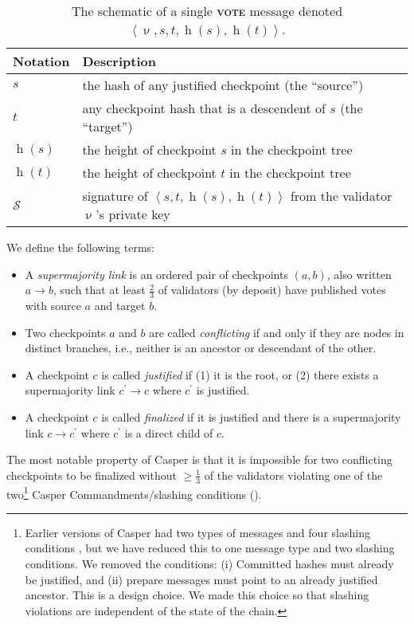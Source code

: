 \documentclass[12pt]{article}
\newcommand{\signature}{\ensuremath{\mathcal{S}}\xspace}
\newcommand{\h}{\operatorname{h}\xspace}
\newcommand{\msgVOTE}{\textbf{\textsc{vote}}\xspace}
\begin{document}
\begin{table}[bth]
\centering

   \begin{tabular}{l l}
	\toprule
	\textbf{Notation} & \textbf{Description} \\
	\midrule
	$s$ & the hash of any justified checkpoint (the ``source'') \\
	$t$ & any checkpoint hash that is a descendent of  $s$ (the ``target'') \\
	$\h(s)$ & the height of checkpoint $s$ in the checkpoint tree \\
	$\h(t)$ & the height of checkpoint $t$ in the checkpoint tree \\
	\signature & signature of $\left\langle s, t, \h(s), \h(t) \right\rangle$ from the validator $\upnu$'s private key \\
	\bottomrule
	\end{tabular}


\vspace{0.15in}
\caption{The schematic of a single \msgVOTE message denoted $\left\langle \upnu, s, t, \h(s), \h(t) \right\rangle$.}
\label{tbl:messages}
\end{table}



We define the following terms:
\begin{itemize}
\item A \emph{supermajority link} is an ordered pair of checkpoints $(a, b)$, also written $a \rightarrow b$, such that at least $\frac{2}{3}$ of validators (by deposit) have published votes with source $a$ and target $b$.

\item Two checkpoints $a$ and $b$ are called \emph{conflicting} if and only if they are nodes in distinct branches, i.e., neither is an ancestor or descendant of the other.

\item A checkpoint $c$ is called \emph{justified} if (1) it is the root, or (2) there exists a supermajority link $c^\prime \to c$ where $c^\prime$ is justified.

\item A checkpoint $c$ is called \emph{finalized} if it is justified and there is a supermajority link $c \to c^\prime$ where $c^\prime$ is a direct child of $c$.
\end{itemize}

The most notable property of Casper is that it is impossible for two conflicting checkpoints to be finalized without $\geq \frac{1}{3}$ of the validators violating one of the two\footnote{Earlier versions of Casper had two types of messages and four slashing conditions \cite{minslashing}, but we have reduced this to one message type and two slashing conditions.  We removed the conditions: (i) Committed hashes must already be justified, and (ii) prepare messages must point to an already justified ancestor.  This is a design choice.  We made this choice so that slashing violations are independent of the state of the chain.} Casper Commandments/slashing conditions ().  
\end{document}
